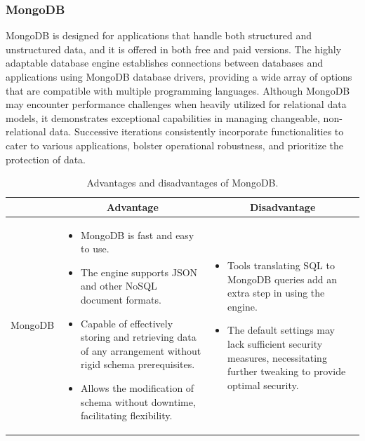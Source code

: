 \subsubsection{MongoDB}

MongoDB is designed for applications that handle both structured and unstructured data, and it is offered in both free and paid versions. The highly adaptable database engine establishes connections between databases and applications using MongoDB database drivers, providing a wide array of options that are compatible with multiple programming languages. Although MongoDB may encounter performance challenges when heavily utilized for relational data models, it demonstrates exceptional capabilities in managing changeable, non-relational data. Successive iterations consistently incorporate functionalities to cater to various applications, bolster operational robustness, and prioritize the protection of data.

\begin{table}[H]
    \centering
    \begin{tabular}{| c | p{} | p{} |}
        \hline
        \multicolumn{1}{|c|}{}
        & \multicolumn{1}{c|}{Advantage}
        & \multicolumn{1}{c|}{Disadvantage} \\ \hline
        \multirow{7}{*}{MongoDB}     
                &   \begin{itemize}[leftmargin=*,topsep=0pt,partopsep=0pt,parsep=0pt]
                        \item MongoDB is fast and easy to use.
                        \item The engine supports JSON and other NoSQL document formats.
                        \item Capable of effectively storing and retrieving data of any arrangement without rigid schema prerequisites.
                        \item  Allows the modification of schema without downtime, facilitating flexibility.
                    \end{itemize}
                &   \begin{itemize}[leftmargin=*,topsep=0pt,partopsep=0pt,parsep=0pt]
                        \item Tools translating SQL to MongoDB queries add an extra step in using the engine.
                        \item The default settings may lack sufficient security measures, necessitating further tweaking to provide optimal security.
                    \end{itemize} \\ \hline
    \end{tabular}
    \caption{Advantages and disadvantages of MongoDB.}
\end{table}

